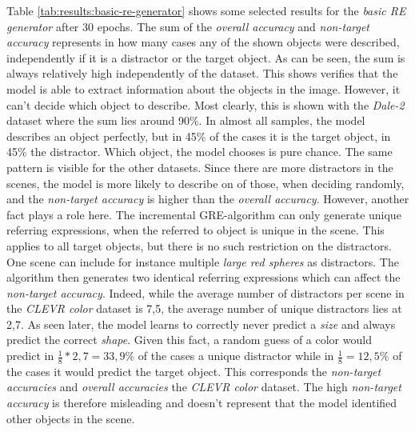 Table \ref{tab:results:basic-re-generator} shows some selected results for the \emph{basic RE generator} after 30 epochs.
The sum of the \emph{overall accuracy} and \emph{non-target accuracy} represents in how many cases any of the shown objects were described, independently if it is a distractor or the target object.
As can be seen, the sum is always relatively high independently of the dataset.
This shows verifies that the model is able to extract information about the objects in the image.
However, it can't decide which object to describe.
Most clearly, this is shown with the \emph{Dale-2} dataset where the sum lies around 90\%.
In almost all samples, the  model describes an object perfectly, but in 45\% of the cases it is the target object, in 45\% the distractor.
Which object, the model chooses is pure chance.
The same pattern is visible for the other datasets.
Since there are more distractors in the scenes, the model is more likely to describe on of those, when deciding randomly, and the \emph{non-target accuracy} is higher than the \emph{overall accuracy}.
However, another fact plays a role here.
The incremental GRE-algorithm can only generate unique referring expressions, when the referred to object is unique in the scene.
This applies to all target objects, but there is no such restriction on the distractors.
One scene can include for instance multiple \emph{large red spheres} as distractors.
The algorithm then generates two identical referring expressions which can affect the \emph{non-target accuracy}.
Indeed, while the average number of distractors per scene in the \emph{CLEVR color} dataset is 7,5, the average number of unique distractors lies at 2,7.
As seen later, the model learns to correctly never predict a \emph{size} and always predict the correct \emph{shape}.
Given this fact, a random guess of a color would predict in $\frac{1}{8} * 2,7 = 33,9\%$ of the cases a unique distractor while in $\frac{1}{8}=12,5\%$ of the cases it would predict the target object.
This corresponds the \emph{non-target accuracies} and \emph{overall accuracies} the \emph{CLEVR color} dataset.
The high \emph{non-target accuracy} is therefore misleading and doesn't represent that the model identified other objects in the scene.

